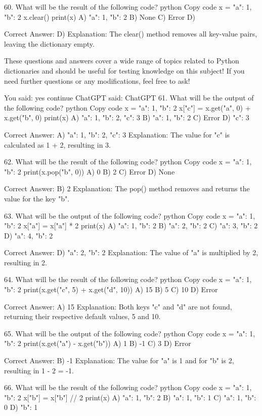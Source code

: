 60. What will be the result of the following code?
python
Copy code
x = {"a": 1, "b": 2}
x.clear()
print(x)
A) {"a": 1, "b": 2}
B) None
C) Error
D) {}

Correct Answer: D) {}
Explanation: The clear() method removes all key-value pairs, leaving the dictionary empty.

These questions and answers cover a wide range of topics related to Python dictionaries and should be useful for testing knowledge on this subject! If you need further questions or any modifications, feel free to ask!






You said:
yes continue
ChatGPT said:
ChatGPT
61. What will be the output of the following code?
python
Copy code
x = {"a": 1, "b": 2}
x["c"] = x.get("a", 0) + x.get("b", 0)
print(x)
A) {"a": 1, "b": 2, "c": 3}
B) {"a": 1, "b": 2}
C) Error
D) {"c": 3}

Correct Answer: A) {"a": 1, "b": 2, "c": 3}
Explanation: The value for "c" is calculated as 1 + 2, resulting in 3.

62. What will be the result of the following code?
python
Copy code
x = {"a": 1, "b": 2}
print(x.pop("b", 0))
A) 0
B) 2
C) Error
D) None

Correct Answer: B) 2
Explanation: The pop() method removes and returns the value for the key "b".

63. What will be the output of the following code?
python
Copy code
x = {"a": 1, "b": 2}
x["a"] = x["a"] * 2
print(x)
A) {"a": 1, "b": 2}
B) {"a": 2, "b": 2}
C) {"a": 3, "b": 2}
D) {"a": 4, "b": 2}

Correct Answer: D) {"a": 2, "b": 2}
Explanation: The value of "a" is multiplied by 2, resulting in 2.

64. What will be the result of the following code?
python
Copy code
x = {"a": 1, "b": 2}
print(x.get("c", 5) + x.get("d", 10))
A) 15
B) 5
C) 10
D) Error

Correct Answer: A) 15
Explanation: Both keys "c" and "d" are not found, returning their respective default values, 5 and 10.

65. What will be the output of the following code?
python
Copy code
x = {"a": 1, "b": 2}
print(x.get("a") - x.get("b"))
A) 1
B) -1
C) 3
D) Error

Correct Answer: B) -1
Explanation: The value for "a" is 1 and for "b" is 2, resulting in 1 - 2 = -1.

66. What will be the result of the following code?
python
Copy code
x = {"a": 1, "b": 2}
x["b"] = x["b"] // 2
print(x)
A) {"a": 1, "b": 2}
B) {"a": 1, "b": 1}
C) {"a": 1, "b": 0}
D) {"b": 1}

